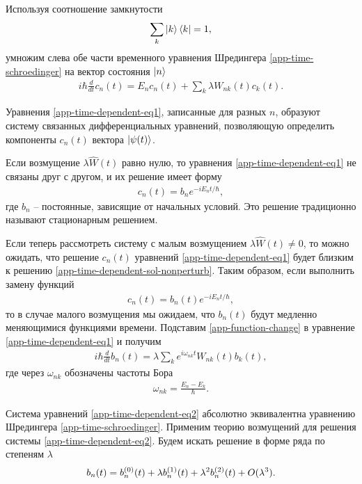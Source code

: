 Используя соотношение замкнутости
\begin{gather}
    \sum_k \ket{k} \bra{k} = 1, \label{app-completeness}
\end{gather}
умножим слева обе части временного уравнения Шредингера \eqref{app-time-schroedinger} на вектор состояния $\ket{n}$
\begin{gather}
    i \hbar \frac{d}{dt} c_n(t) = E_n c_n(t) + \sum_k \lambda W_{nk}(t) c_k(t). \label{app-time-dependent-eq1} 
\end{gather}

Уравнения \eqref{app-time-dependent-eq1}, записанные для разных $n$, образуют систему связанных дифференциальных уравнений, позволяющую определить компоненты $c_n(t)$ вектора $\ket{\psi(t)}$. \par
Если возмущение $\lambda \hat{W}(t)$ равно нулю, то уравнения \eqref{app-time-dependent-eq1} не связаны друг с другом, и их решение имеет форму
\begin{gather}
    c_n(t) = b_n e^{-i E_n t / \hbar}, \label{app-time-dependent-sol-nonperturb}
\end{gather}
где $b_n$ -- постоянные, зависящие от начальных условий. Это решение традиционно называют стационарным решением. \par
Если теперь рассмотреть систему с малым возмущением $\lambda \hat{W}(t) \neq 0$, то можно ожидать, что решение $c_n(t)$ уравнений \eqref{app-time-dependent-eq1} будет близким к решению \eqref{app-time-dependent-sol-nonperturb}. Таким образом, если выполнить замену функций
\begin{gather}
    c_n(t) = b_n(t) e^{-i E_n t / \hbar}, \label{app-function-change}
\end{gather}
то в случае малого возмущения мы ожидаем, что $b_n(t)$ будут медленно меняющимися функциями времени. Подставим \eqref{app-function-change} в уравнение \eqref{app-time-dependent-eq1} и получим
\begin{gather}
    i \hbar \frac{d}{dt} b_n(t) = \lambda \sum_k e^{i \omega_{nk} t} W_{nk}(t) b_k(t), \label{app-time-dependent-eq2} 
\end{gather}
где через $\omega_{nk}$ обозначены частоты Бора
\begin{gather}
    \omega_{nk} = \frac{E_n - E_k}{\hbar}.
\end{gather}

Система уравнений \eqref{app-time-dependent-eq2} абсолютно эквивалентна уравнению Шредингера \eqref{app-time-schroedinger}. Применим теорию возмущений для решения системы \eqref{app-time-dependent-eq2}. Будем искать решение в форме ряда по степеням $\lambda$
\begin{gather}
    b_n(t) = b_n^{(0)}(t) + \lambda b_n^{(1)}(t) + \lambda^2 b_n^{(2)}(t) + O(\lambda^3). \label{app-series}
\end{gather}


